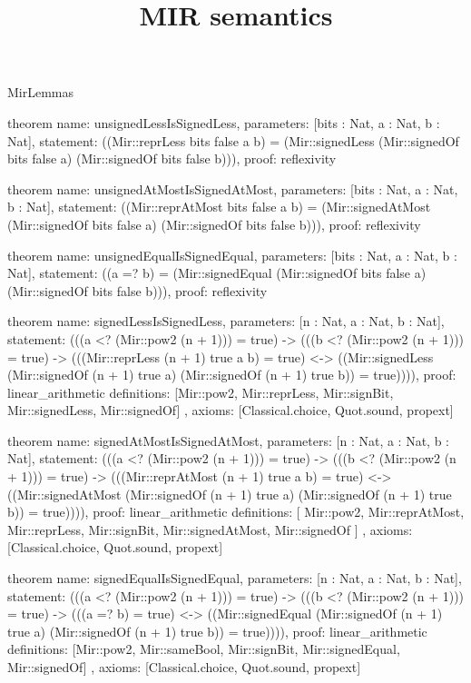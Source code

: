 \begin{lexlean}{MirLemmas}
\title{MIR semantics}
\begin{semanticmodule}
theorem{
  name: unsignedLessIsSignedLess,
  parameters: [bits : Nat, a : Nat, b : Nat],
  statement: ((Mir::reprLess bits false a b) = (Mir::signedLess (Mir::signedOf bits false a) (Mir::signedOf bits false b))),
  proof: reflexivity{}
}

theorem{
  name: unsignedAtMostIsSignedAtMost,
  parameters: [bits : Nat, a : Nat, b : Nat],
  statement: ((Mir::reprAtMost bits false a b) = (Mir::signedAtMost (Mir::signedOf bits false a) (Mir::signedOf bits false b))),
  proof: reflexivity{}
}

theorem{
  name: unsignedEqualIsSignedEqual,
  parameters: [bits : Nat, a : Nat, b : Nat],
  statement: ((a =? b) = (Mir::signedEqual (Mir::signedOf bits false a) (Mir::signedOf bits false b))),
  proof: reflexivity{}
}

theorem{
  name: signedLessIsSignedLess,
  parameters: [n : Nat, a : Nat, b : Nat],
  statement: (((a <? (Mir::pow2 (n + 1))) = true) -> (((b <? (Mir::pow2 (n + 1))) = true) -> (((Mir::reprLess (n + 1) true a b) = true) <-> ((Mir::signedLess (Mir::signedOf (n + 1) true a) (Mir::signedOf (n + 1) true b)) = true)))),
  proof: linear_arithmetic{
    definitions: [Mir::pow2, Mir::reprLess, Mir::signBit, Mir::signedLess, Mir::signedOf]
  },
  axioms: [Classical.choice, Quot.sound, propext]
}

theorem{
  name: signedAtMostIsSignedAtMost,
  parameters: [n : Nat, a : Nat, b : Nat],
  statement: (((a <? (Mir::pow2 (n + 1))) = true) -> (((b <? (Mir::pow2 (n + 1))) = true) -> (((Mir::reprAtMost (n + 1) true a b) = true) <-> ((Mir::signedAtMost (Mir::signedOf (n + 1) true a) (Mir::signedOf (n + 1) true b)) = true)))),
  proof: linear_arithmetic{
    definitions: [
      Mir::pow2,
      Mir::reprAtMost,
      Mir::reprLess,
      Mir::signBit,
      Mir::signedAtMost,
      Mir::signedOf
    ]
  },
  axioms: [Classical.choice, Quot.sound, propext]
}

theorem{
  name: signedEqualIsSignedEqual,
  parameters: [n : Nat, a : Nat, b : Nat],
  statement: (((a <? (Mir::pow2 (n + 1))) = true) -> (((b <? (Mir::pow2 (n + 1))) = true) -> (((a =? b) = true) <-> ((Mir::signedEqual (Mir::signedOf (n + 1) true a) (Mir::signedOf (n + 1) true b)) = true)))),
  proof: linear_arithmetic{
    definitions: [Mir::pow2, Mir::sameBool, Mir::signBit, Mir::signedEqual, Mir::signedOf]
  },
  axioms: [Classical.choice, Quot.sound, propext]
}


\end{semanticmodule}
\end{lexlean}
